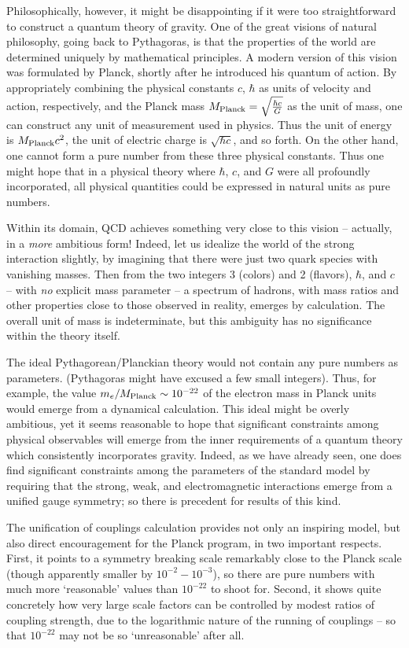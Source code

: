 \documentclass[aps,epsf]{revtex4}
\begin{document}
Philosophically, however, it
might be disappointing if it were too straightforward to construct a
quantum theory of gravity.  One of the great visions of natural
philosophy, going back to Pythagoras, is that the properties of the
world are determined uniquely by mathematical principles.  A modern
version of this vision was formulated by Planck, shortly after he
introduced his quantum of action.  By appropriately combining the
physical constants $c$, $\hbar$ as units of velocity and action,
respectively, and the Planck mass $M_{\rm Planck} = \sqrt {\hbar c
\over G}$ as the unit of mass, one can construct any unit of
measurement used in physics.   
Thus the unit of energy is $M_{\rm Planck} c^2$, the unit of electric
charge is $\sqrt {\hbar c}$, and so forth.  On the other hand, one
cannot form a pure number from these three physical constants.  Thus
one might hope that in a physical theory where $\hbar$, $c$, and $G$
were all profoundly incorporated, all physical quantities could be
expressed in natural units as pure numbers.

Within its domain, QCD achieves  something very close to
this vision --  actually, in a {\it more\/} ambitious form!   Indeed,
let us idealize the world of the strong interaction slightly, by
imagining that there were just two quark species with vanishing
masses.   Then from the two integers 3 (colors) and 2 (flavors),
$\hbar$, and $c$ -- with {\it no\/} explicit mass parameter -- a
spectrum of hadrons, with mass ratios and other properties close
to those observed in reality, emerges by calculation.   
The overall unit of mass is indeterminate, but this ambiguity has no
significance within the theory itself.  

The ideal
Pythagorean/Planckian theory would not contain any pure numbers as
parameters.  (Pythagoras might have excused a few small integers).
Thus, for example, the value $m_e/M_{\rm Planck} \sim 10^{-22}$ of the
electron mass in Planck units would emerge from a dynamical
calculation.
This ideal might be overly ambitious, yet it seems reasonable to
hope that significant constraints among physical observables will
emerge from the inner requirements of a quantum theory which
consistently incorporates gravity.  Indeed, as we have already seen, one does
find significant constraints among the parameters of the standard
model by requiring that the strong, weak, and electromagnetic
interactions emerge from a unified gauge symmetry; so there is
precedent for results of this kind.

The unification of couplings calculation provides not only an
inspiring model, 
but also direct
encouragement for the Planck program, in two important respects.  First,
it points to a symmetry breaking scale remarkably close to the Planck
scale (though apparently smaller by $10^{-2}-10^{-3}$), so there are
pure numbers with much more `reasonable' values than $10^{-22}$ to
shoot for.  Second, it shows quite concretely how very large scale
factors can be controlled by modest ratios of coupling strength, due
to the logarithmic nature of the running of couplings -- so that
$10^{-22}$ may not be so `unreasonable' after all.  
\end{document}
